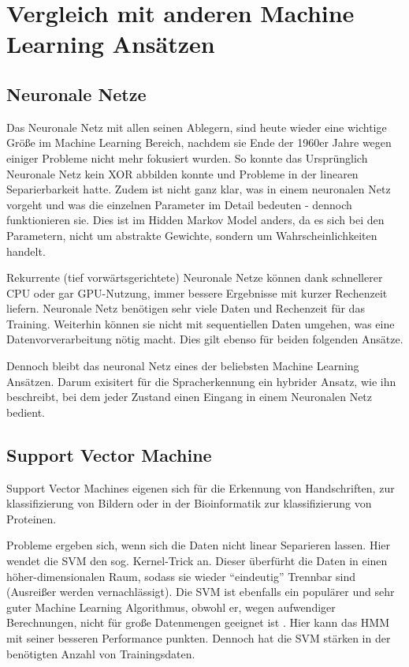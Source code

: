 \chapter{Vergleich mit anderen Machine Learning Ansätzen}  \label{mainsec:comp}

\section{Neuronale Netze} \label{sec:neuron}
Das Neuronale Netz mit allen seinen Ablegern, sind heute wieder eine wichtige Größe im Machine Learning Bereich, nachdem sie Ende der 1960er Jahre wegen einiger Probleme nicht mehr fokusiert wurden. So konnte das Ursprünglich Neuronale Netz kein XOR abbilden konnte und Probleme in der linearen Separierbarkeit hatte. Zudem ist nicht ganz klar, was in einem  neuronalen Netz vorgeht und was die einzelnen Parameter im Detail bedeuten \cite[167]{marsland} - dennoch funktionieren sie. Dies ist im Hidden Markov Model anders, da es sich bei den Parametern, nicht um abstrakte Gewichte, sondern um Wahrscheinlichkeiten handelt.

Rekurrente (tief vorwärtsgerichtete) Neuronale Netze können dank schnellerer CPU oder gar GPU-Nutzung, immer bessere Ergebnisse mit kurzer Rechenzeit liefern. 
Neuronale Netz benötigen sehr viele Daten und Rechenzeit für das Training. Weiterhin können sie nicht mit sequentiellen Daten umgehen, was eine Datenvorverarbeitung nötig macht. Dies gilt ebenso für beiden folgenden Ansätze.

Dennoch bleibt das neuronal Netz eines der beliebsten Machine Learning Ansätzen. Darum exisitert für die Spracherkennung ein hybrider Ansatz, wie ihn \cite{hmmnn} beschreibt, bei dem jeder Zustand einen Eingang in einem Neuronalen Netz bedient.


\section{Support Vector Machine} \label{sec:svm}
Support Vector Machines eigenen sich für die Erkennung von Handschriften, zur klassifizierung von Bildern oder in der Bioinformatik zur klassifizierung von Proteinen.

Probleme ergeben sich, wenn sich die Daten nicht linear Separieren lassen. Hier wendet die SVM den sog. Kernel-Trick an. Dieser überfürht die Daten in einen höher-dimensionalen Raum, sodass sie wieder ``eindeutig'' Trennbar sind (Ausreißer werden vernachlässigt).
Die SVM ist ebenfalls ein populärer und sehr guter Machine Learning Algorithmus, obwohl er, wegen aufwendiger Berechnungen, nicht für große Datenmengen geeignet ist \cite[119]{marsland}. Hier kann das HMM mit seiner besseren Performance punkten. Dennoch hat die SVM stärken in der benötigten Anzahl von Trainingsdaten.

